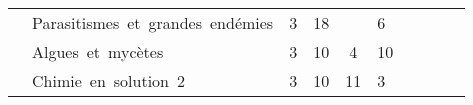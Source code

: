 \begin{tabular}{c|m{6cm}|cm{0.75cm}|cm{0.75cm}|cm{0.75cm}|cm{0.75cm}|}
\cline{2-6} 
 & \color{black} \mbox{Parasitismes et grandes endémies} & \color{black} 3 & \color{black} 18 & \color{black}  & \color{black} 6 & 
\\ \cline{2-6}
 & \cellcolor{couleurClaire} \color{couleurTexte} \mbox{Algues et mycètes} & \cellcolor{couleurClaire} \color{couleurTexte} 3 & \cellcolor{couleurClaire} \color{couleurTexte} 10 & \cellcolor{couleurClaire} \color{couleurTexte} 4 &\cellcolor{couleurClaire} \color{couleurTexte} 10 \\ 
\cline{2-6} 
 & \color{black} \mbox{Chimie en solution 2} & \color{black} 3 & \color{black} 10 & \color{black} 11 & \color{black} 3 & 
\\ \cline{1-6}
\end{tabular}


